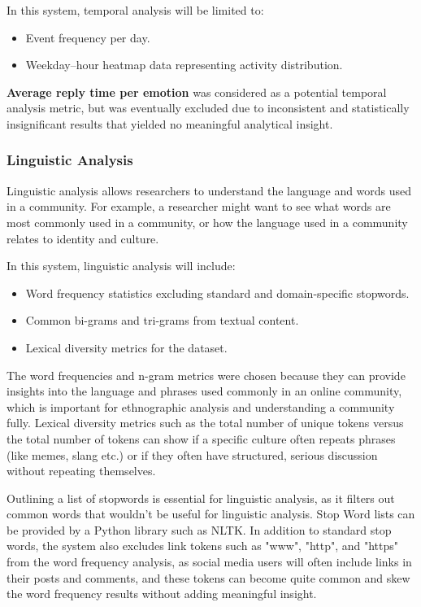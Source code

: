 \documentclass[12pt, a4paper]{article}
\begin{document}
In this system, temporal analysis will be limited to:
\begin{itemize}
    \item Event frequency per day.
    \item Weekday--hour heatmap data representing activity distribution.
\end{itemize}

\textbf{Average reply time per emotion} was considered as a potential temporal analysis metric, but was eventually excluded due to inconsistent and statistically insignificant results that yielded no meaningful analytical insight. 

\subsubsection{Linguistic Analysis}
Linguistic analysis allows researchers to understand the language and words used in a community. For example, a researcher might want to see what words are most commonly used in a community, or how the language used in a community relates to identity and culture.

In this system, linguistic analysis will include:
\begin{itemize}
    \item Word frequency statistics excluding standard and domain-specific stopwords.
    \item Common bi-grams and tri-grams from textual content. \cite{mungalpara2022stemming}
    \item Lexical diversity metrics for the dataset.
\end{itemize}

The word frequencies and n-gram metrics were chosen because they can provide insights into the language and phrases used commonly in an online community, which is important for ethnographic analysis and understanding a community fully. Lexical diversity metrics such as the total number of unique tokens versus the total number of tokens can show if a specific culture often repeats phrases (like memes, slang etc.) or if they often have structured, serious discussion without repeating themselves.

Outlining a list of stopwords is essential for linguistic analysis, as it filters out common words that wouldn't be useful for linguistic analysis. Stop Word lists can be provided by a Python library such as NLTK. In addition to standard stop words, the system also excludes link tokens such as "www", "http", and "https" from the word frequency analysis, as social media users will often include links in their posts and comments, and these tokens can become quite common and skew the word frequency results without adding meaningful insight.
\end{document}
